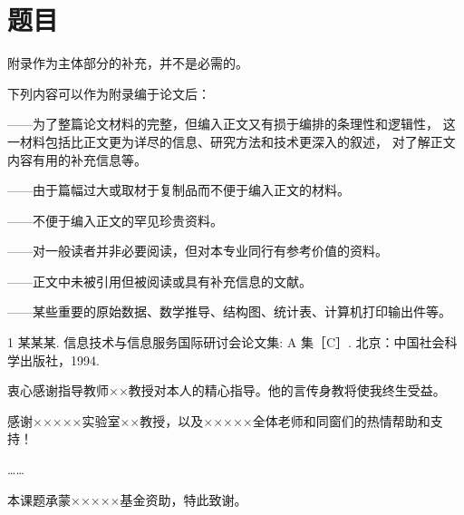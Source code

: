 \documentclass[degree=bachelor]{thuthesis}
\begin{document}
\chapter{题目}

附录作为主体部分的补充，并不是必需的。

下列内容可以作为附录编于论文后：

——为了整篇论文材料的完整，但编入正文又有损于编排的条理性和逻辑性，
这一材料包括比正文更为详尽的信息、研究方法和技术更深入的叙述，
对了解正文内容有用的补充信息等。

——由于篇幅过大或取材于复制品而不便于编入正文的材料。

——不便于编入正文的罕见珍贵资料。

——对一般读者并非必要阅读，但对本专业同行有参考价值的资料。

——正文中未被引用但被阅读或具有补充信息的文献。

——某些重要的原始数据、数学推导、结构图、统计表、计算机打印输出件等。


\begin{thebibliography}{1}
某某某.
\newblock 信息技术与信息服务国际研讨会论文集: A 集［C］.
\newblock 北京：中国社会科学出版社，1994.
\end{thebibliography}


\backmatter

\begin{acknowledgements}
  衷心感谢指导教师××教授对本人的精心指导。他的言传身教将使我终生受益。

  感谢×××××实验室××教授，以及×××××全体老师和同窗们的热情帮助和支持！

  ……

  本课题承蒙×××××基金资助，特此致谢。
\end{acknowledgements}


\statement
\end{document}
